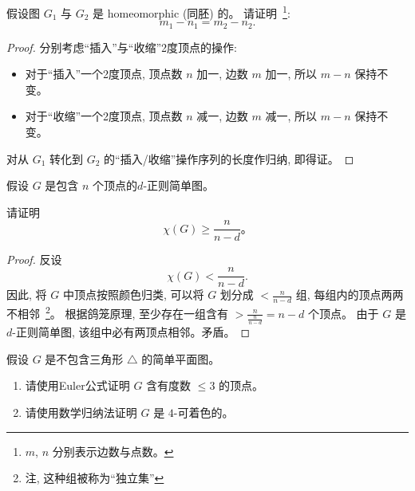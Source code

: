 \documentclass[a4paper, justified]{tufte-handout}
\begin{document}
\begin{problem}[图同胚]
  假设图 $G_{1}$ 与 $G_{2}$ 是 homeomorphic (同胚) 的。
  请证明~\footnote{$m$, $n$ 分别表示边数与点数。}:
  \[
    m_{1} - n_{1} = m_{2} - n_{2}.
  \]
\end{problem}

\begin{proof}
  分别考虑``插入''与``收缩''2度顶点的操作:
  \begin{itemize}
    \item 对于``插入''一个2度顶点, 顶点数 $n$ 加一, 边数 $m$ 加一, 所以 $m-n$ 保持不变。
    \item 对于``收缩''一个2度顶点, 顶点数 $n$ 减一, 边数 $m$ 减一, 所以 $m-n$ 保持不变。
  \end{itemize}
  对从 $G_{1}$ 转化到 $G_{2}$ 的``插入/收缩''操作序列的长度作归纳, 即得证。
\end{proof}

\begin{problem}[图着色]
  假设 $G$ 是包含 $n$ 个顶点的$d$-正则简单图。

  \noindent 请证明
  \[
    \chi(G) \ge \frac{n}{n-d}\text{。}
  \]
\end{problem}

\begin{proof}
  反设
  \[
    \chi(G) < \frac{n}{n-d}.
  \]
  因此, 将 $G$ 中顶点按照颜色归类, 可以将 $G$ 划分成 $< \frac{n}{n-d}$ 组,
  每组内的顶点两两不相邻~\footnote{注, 这种组被称为``独立集''}。
  根据鸽笼原理, 至少存在一组含有 $> \frac{n}{\frac{n}{n-d}} = n - d$ 个顶点。
  由于 $G$ 是 $d$-正则简单图, 该组中必有两顶点相邻。矛盾。
\end{proof}

\begin{problem}[平面图的着色]
  假设 $G$ 是不包含三角形 $\triangle$ 的简单平面图。
  \begin{enumerate}[(1)]
    \item 请使用Euler公式证明 $G$ 含有度数 $\le 3$ 的顶点。
    \item 请使用数学归纳法证明 $G$ 是 $4$-可着色的。
  \end{enumerate}
\end{problem}
\end{document}
